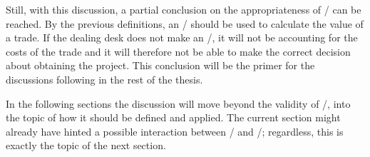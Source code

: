\documentclass[main.tex]{subfiles}
\begin{document}
    Still, with this discussion, 
    a partial conclusion on the appropriateness of \FVA/ can be reached.
    By the previous definitions, an \FVA/ should be used to calculate the value of a trade.
    If the dealing desk does not make an \FVA/, it will not be accounting for the costs of the trade
    and it will therefore not be able to make the correct decision about obtaining the project.
    This conclusion will be the primer for the discussions following in the rest of the thesis.
    
    In the following sections the discussion will move beyond the validity of \FVA/,
    into the topic of how it should be defined and applied.
    The current section might already have hinted a possible interaction between \FVA/ and \DVA/;
    regardless, this is exactly the topic of the next section.
    
\end{document}
